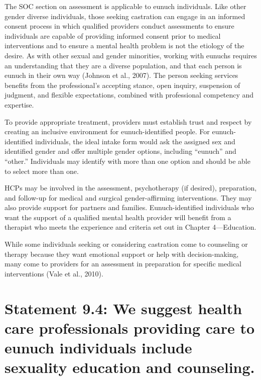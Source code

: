 \documentclass[
]{book}
\begin{document}
The SOC section on assessment is applicable to
eunuch individuals. Like other gender diverse individuals, those seeking castration can engage in an
informed consent process in which qualified providers conduct assessments to ensure individuals are
capable of providing informed consent prior to medical interventions and to ensure a mental health
problem is not the etiology of the desire. As with
other sexual and gender minorities, working with
eunuchs requires an understanding that they are a
diverse population, and that each person is eunuch
in their own way (Johnson et al., 2007). The person
seeking services benefits from the professional's
accepting stance, open inquiry, suspension of judgment, and flexible expectations, combined with professional competency and expertise.

To provide appropriate treatment, providers
must establish trust and respect by creating an
inclusive environment for eunuch-identified people. For eunuch-identified individuals, the ideal
intake form would ask the assigned sex and identified gender and offer multiple gender options,
including ``eunuch'' and ``other.'' Individuals may
identify with more than one option and should
be able to select more than one.

HCPs may be involved in the assessment, psychotherapy (if desired), preparation, and follow-up
for medical and surgical gender-affirming interventions. They may also provide support for partners and families. Eunuch-identified individuals
who want the support of a qualified mental
health provider will benefit from a therapist who
meets the experience and criteria set out in
Chapter 4---Education.

While some individuals seeking or considering
castration come to counseling or therapy because
they want emotional support or help with
decision-making, many come to providers for an
assessment in preparation for specific medical
interventions (Vale et al., 2010).

\hypertarget{statement-9.4-we-suggest-health-care-professionals-providing-care-to-eunuch-individuals-include-sexuality-education-and-counseling.}{%
\section*{Statement 9.4: We suggest health care professionals providing care to eunuch individuals include sexuality education and counseling.}\label{statement-9.4-we-suggest-health-care-professionals-providing-care-to-eunuch-individuals-include-sexuality-education-and-counseling.}}
\end{document}
